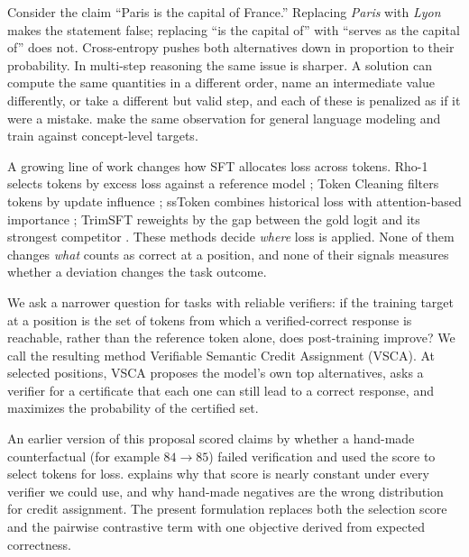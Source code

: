 \documentclass{article}
\newcommand{\vsca}{\textsc{VSCA}}
\theoremstyle{plain}
\theoremstyle{remark}
\begin{document}
Consider the claim ``Paris is the capital of France.'' Replacing \emph{Paris} with \emph{Lyon} makes the statement false; replacing ``is the capital of'' with ``serves as the capital of'' does not. Cross-entropy pushes both alternatives down in proportion to their probability. In multi-step reasoning the same issue is sharper. A solution can compute the same quantities in a different order, name an intermediate value differently, or take a different but valid step, and each of these is penalized as if it were a mistake. \citet{beyondTokens} make the same observation for general language modeling and train against concept-level targets.

A growing line of work changes how SFT allocates loss across tokens. Rho-1 selects tokens by excess loss against a reference model \citep{rho1}; Token Cleaning filters tokens by update influence \citep{tokenCleaning}; ssToken combines historical loss with attention-based importance \citep{ssToken}; TrimSFT reweights by the gap between the gold logit and its strongest competitor \citep{trimSFT}. These methods decide \emph{where} loss is applied. None of them changes \emph{what} counts as correct at a position, and none of their signals measures whether a deviation changes the task outcome.

We ask a narrower question for tasks with reliable verifiers: if the training target at a position is the set of tokens from which a verified-correct response is reachable, rather than the reference token alone, does post-training improve? We call the resulting method Verifiable Semantic Credit Assignment (\vsca). At selected positions, \vsca{} proposes the model's own top alternatives, asks a verifier for a certificate that each one can still lead to a correct response, and maximizes the probability of the certified set.

An earlier version of this proposal scored claims by whether a hand-made counterfactual (for example $84\rightarrow 85$) failed verification and used the score to select tokens for loss.  explains why that score is nearly constant under every verifier we could use, and why hand-made negatives are the wrong distribution for credit assignment. The present formulation replaces both the selection score and the pairwise contrastive term with one objective derived from expected correctness.
\end{document}
